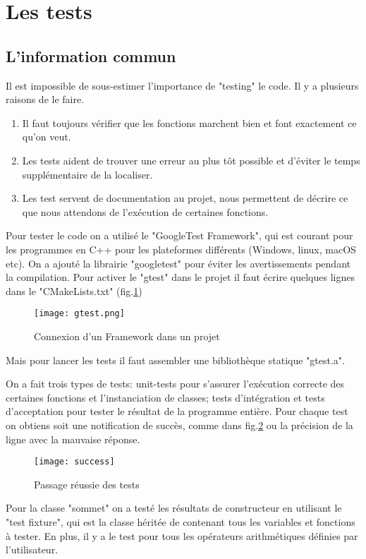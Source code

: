 \documentclass[12pt]{article}
\begin{document}
	\section{Les tests}
	\subsection{L'information commun}
	Il est impossible de sous-estimer l'importance de "testing" le code. Il y a plusieurs raisons de le faire. 
	\begin{enumerate}
		\item{Il faut toujours vérifier que les fonctions marchent bien et font exactement ce qu'on veut. }
		\item {Les tests aident de trouver une erreur au plus tôt possible et d'éviter le temps supplémentaire de la localiser.}
		\item{Les test servent de documentation au projet, nous permettent de décrire ce que nous attendons de l'exécution de certaines fonctions.}
	\end{enumerate} 
	Pour tester le code on a utilisé le "GoogleTest Framework", qui est courant pour les programmes en C++ pour les plateformes différents (Windows, linux, macOS etc). On a ajouté la librairie "googletest" pour éviter les avertissements pendant la compilation. Pour activer le "gtest" dans le projet il faut écrire quelques lignes dans le "CMakeLists.txt" (fig.\ref{gtest})
	\begin{figure}[H]
		\centering
		\texttt{[image: gtest.png]}
		\caption{Connexion d'un Framework dans un projet}
		\label{gtest}
	\end{figure}

	
	Mais pour lancer les tests il faut assembler une bibliothèque statique "gtest.a".
	
	On a fait trois types de tests: unit-tests pour s'assurer l'exécution correcte des certaines fonctions et l'instanciation de classes; tests d'intégration et tests d'acceptation pour tester le résultat de la programme entière. Pour chaque test on obtiens soit une notification de succès, comme dans fig.\ref{success} ou la précision de la ligne avec la mauvaise réponse.
	\begin{figure}[H]
		\centering
		\texttt{[image: success]}
		\caption{Passage réussie des tests}
		\label{success}
	\end{figure}
	Pour la classe "sommet" on a testé les résultats de constructeur en utilisant le "test fixture", qui est la classe héritée de  contenant tous les variables et fonctions à tester. En plus, il y a le test pour tous les opérateurs arithmétiques définies par l'utilisateur.
	
\end{document}
